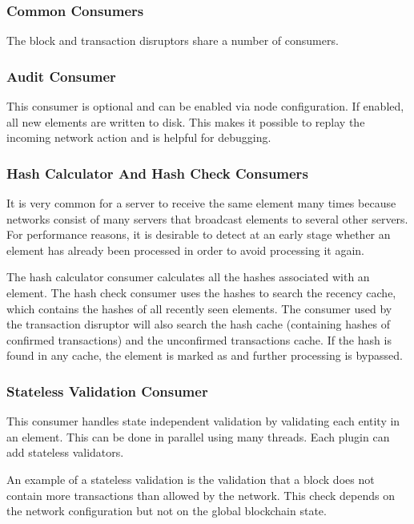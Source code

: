 \subsubsection{Common Consumers}
\label{sec:disruptor:commonConsumers}
The block and transaction disruptors share a number of consumers.

\subsubsection*{Audit Consumer}
This consumer is optional and can be enabled via node configuration.
If enabled, all new elements are written to disk.
This makes it possible to replay the incoming network action and is helpful for debugging.

\subsubsection*{Hash Calculator And Hash Check Consumers}
It is very common for a server to receive the same element many times because networks consist of many servers that broadcast elements to several other servers.
For performance reasons, it is desirable to detect at an early stage whether an element has already been processed in order to avoid processing it again.

The hash calculator consumer calculates all the hashes associated with an element.
The hash check consumer uses the hashes to search the recency cache, which contains the hashes of all recently seen elements.
The consumer used by the transaction disruptor will also search the hash cache (containing hashes of confirmed transactions) and the unconfirmed transactions cache.
If the hash is found in any cache, the element is marked as  and further processing is bypassed.

\subsubsection*{Stateless Validation Consumer}
This consumer handles state independent validation by validating each entity in an element.
This can be done in parallel using many threads.
Each plugin can add stateless validators.

An example of a stateless validation is the validation that a block does not contain more transactions than allowed by the network.
This check depends on the network configuration but not on the global blockchain state.

